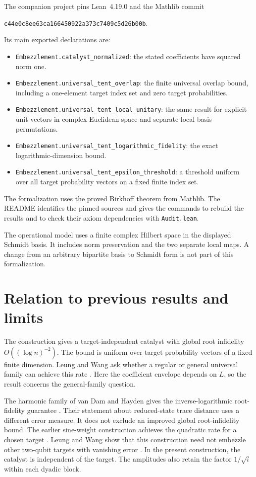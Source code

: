 \documentclass[11pt]{article}
\begin{document}
The companion project pins Lean~4.19.0 and the Mathlib commit
\begin{center}\texttt{c44e0c8ee63ca166450922a373c7409c5d26b00b}.\end{center}
Its main exported declarations are:
\begin{itemize}[leftmargin=1.5em,itemsep=2pt]
\item {\small\texttt{Embezzlement.catalyst\_normalized}}: the stated coefficients have squared norm one.
\item {\small\texttt{Embezzlement.universal\_tent\_overlap}}: the finite universal overlap bound, including a one-element target index set and zero target probabilities.
\item {\small\texttt{Embezzlement.universal\_tent\_local\_unitary}}: the same result for explicit unit vectors in complex Euclidean space and separate local basis permutations.
\item {\small\texttt{Embezzlement.universal\_tent\_logarithmic\_fidelity}}: the exact logarithmic-dimension bound.
\item {\small\texttt{Embezzlement.universal\_tent\_epsilon\_threshold}}: a threshold uniform over all target probability vectors on a fixed finite index set.
\end{itemize}

The formalization uses the proved Birkhoff theorem from Mathlib. The README identifies the pinned sources and gives the commands to rebuild the results and to check their axiom dependencies with \texttt{Audit.lean}.

The operational model uses a finite complex Hilbert space in the displayed Schmidt basis. It includes norm preservation and the two separate local maps. A change from an arbitrary bipartite basis to Schmidt form is not part of this formalization.

\section{Relation to previous results and limits}\label{sec:prior}

The construction gives a target-independent catalyst with global root infidelity $O((\log n)^{-2})$. The bound is uniform over target probability vectors of a fixed finite dimension. Leung and Wang ask whether a regular or general universal family can achieve this rate \cite{lw}. Here the coefficient envelope depends on $L$, so the result concerns the general-family question.

The harmonic family of van Dam and Hayden gives the inverse-logarithmic root-fidelity guarantee \cite{vdh}. Their statement about reduced-state trace distance uses a different error measure. It does not exclude an improved global root-infidelity bound. The earlier sine-weight construction achieves the quadratic rate for a chosen target \cite{ltw}. Leung and Wang show that this construction need not embezzle other two-qubit targets with vanishing error \cite{lw}. In the present construction, the catalyst is independent of the target. The amplitudes also retain the factor $1/\sqrt i$ within each dyadic block.
\end{document}
